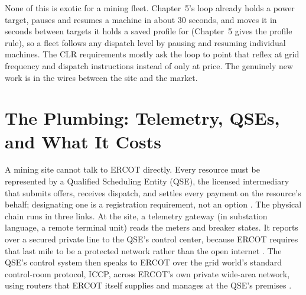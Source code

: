 None of this is exotic for a mining fleet. Chapter~5's loop already holds a power target, pauses and resumes a machine in about 30 seconds, and moves it in seconds between targets it holds a saved profile for (Chapter~5 gives the profile rule), so a fleet follows any dispatch level by pausing and resuming individual machines. The CLR requirements mostly ask the loop to point that reflex at grid frequency and dispatch instructions instead of only at price. %
The genuinely new work is in the wires between the site and the market.

\section{The Plumbing: Telemetry, QSEs, and What It Costs}

A mining site cannot talk to ERCOT directly. Every resource must be represented by a Qualified Scheduling Entity (QSE), the licensed intermediary that submits offers, receives dispatch, and settles every payment on the resource's behalf; designating one is a registration requirement, not an option \autocite{ercot2026protocols}. %
The physical chain runs in three links. At the site, a telemetry gateway (in substation language, a remote terminal unit) reads the meters and breaker states. It reports over a secured private line to the QSE's control center, because ERCOT requires that last mile to be a protected network rather than the open internet \autocite{ercotnog2026}. %
The QSE's control system then speaks to ERCOT over the grid world's standard control-room protocol, ICCP, across ERCOT's own private wide-area network, using routers that ERCOT itself supplies and manages at the QSE's premises \autocite{ercotnog2026,ercoticcp2025}. %

